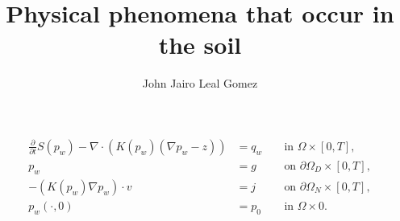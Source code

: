 \documentclass{scrreprt}
\title{Physical phenomena that occur in the soil}
\subtitle{}
\author{John Jairo Leal Gomez}
\begin{document}
\maketitle

\begin{align*}
	\frac{\partial}{\partial t} S\left(p_{w}\right)-\nabla \cdot\left(K\left(p_{w}\right)\left(\nabla p_{w}-z\right)\right) & =q_{w} &  & \text { in } \Omega \times[0, T],              \\
	p_{w}                                                                                                                   & =g     &  & \text { on } \partial \Omega_{D} \times[0, T], \\
	-\left(K\left(p_{w}\right) \nabla p_{w}\right) \cdot v                                                                  & =j     &  & \text { on } \partial \Omega_{N} \times[0, T], \\
	p_{w}(\cdot, 0)                                                                                                         & =p_{0} &  & \text { in } \Omega \times 0 .
\end{align*}
\end{document}
